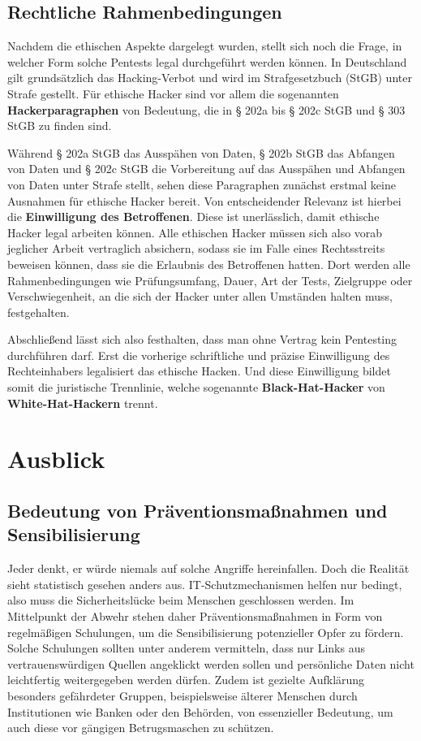 \documentclass[12pt, a4paper, oneside]{scrartcl}
\begin{document}
\subsection{Rechtliche Rahmenbedingungen}
Nachdem die ethischen Aspekte dargelegt wurden, stellt sich noch die Frage, in welcher Form solche 
Pentests legal durchgeführt werden können. In Deutschland gilt grundsätzlich das Hacking-Verbot und wird 
im Strafgesetzbuch (StGB) unter Strafe gestellt. Für ethische Hacker sind vor allem die  
sogenannten \textbf{Hackerparagraphen} von Bedeutung, die in § 202a bis § 202c StGB und § 303 StGB zu finden sind.
\par
Während § 202a StGB das Ausspähen von Daten, § 202b StGB das Abfangen von Daten und § 202c StGB 
die Vorbereitung auf das Ausspähen und Abfangen von Daten unter Strafe stellt, sehen diese Paragraphen
zunächst erstmal keine Ausnahmen für ethische Hacker bereit. Von entscheidender Relevanz ist hierbei 
die \textbf{Einwilligung des Betroffenen}. Diese ist unerlässlich, damit ethische Hacker legal arbeiten können.
Alle ethischen Hacker müssen sich also vorab jeglicher Arbeit vertraglich absichern, sodass sie im 
Falle eines Rechtsstreits beweisen können, dass sie die Erlaubnis des Betroffenen hatten. Dort werden alle
Rahmenbedingungen wie Prüfungsumfang, Dauer, Art der Tests, Zielgruppe oder Verschwiegenheit, an die sich der Hacker 
unter allen Umständen halten muss, festgehalten.
\par
Abschließend lässt sich also festhalten, dass man ohne Vertrag kein Pentesting durchführen darf. Erst die vorherige
schriftliche und präzise Einwilligung des Rechteinhabers legalisiert das ethische Hacken. Und diese Einwilligung
bildet somit die juristische Trennlinie, welche sogenannte \textbf{Black-Hat-Hacker} von \textbf{White-Hat-Hackern} trennt.\\


\section{Ausblick}

\subsection{Bedeutung von Präventionsmaßnahmen und Sensibilisierung}
Jeder denkt, er würde niemals auf solche Angriffe hereinfallen. Doch die Realität sieht statistisch gesehen
anders aus. IT-Schutzmechanismen helfen nur bedingt, also muss die Sicherheitslücke beim Menschen
geschlossen werden. Im Mittelpunkt der Abwehr stehen daher Präventionsmaßnahmen in Form von regelmäßigen Schulungen,
um die Sensibilisierung potenzieller Opfer zu fördern.
Solche Schulungen sollten unter anderem vermitteln, dass nur Links aus vertrauenswürdigen Quellen angeklickt werden sollen 
und persönliche Daten nicht leichtfertig weitergegeben werden dürfen. Zudem ist gezielte Aufklärung besonders gefährdeter Gruppen, 
beispielsweise älterer Menschen durch Institutionen wie Banken oder den Behörden, von essenzieller Bedeutung, um auch diese vor 
gängigen Betrugsmaschen zu schützen.
\end{document}
